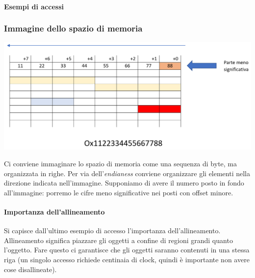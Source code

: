 \documentclass[11pt]{report}
\theoremstyle{definition}
\begin{document}
\paragraph{Esempi di accessi} 
\subsubsection{Immagine dello spazio di memoria}
\begin{center}
\includegraphics[scale=0.72]{img/9.PNG}
\end{center}
Ci conviene immaginare lo spazio di memoria come una sequenza di byte, ma organizzata in righe. Per via dell'\emph{endianess} conviene organizzare gli elementi nella direzione indicata nell'immagine. Supponiamo di avere il numero posto in fondo all'immagine: porremo le cifre meno significative nei posti con offset minore.

\paragraph{Importanza dell'allineamento} Si capisce dall'ultimo esempio di accesso l'importanza dell'allineamento. Allineamento significa piazzare gli oggetti a confine di regioni grandi quanto l'oggetto. Fare questo ci garantisce che gli oggetti saranno contenuti in una stessa riga (un singolo accesso richiede centinaia di clock, quindi è importante non avere cose disallineate).
\end{document}
